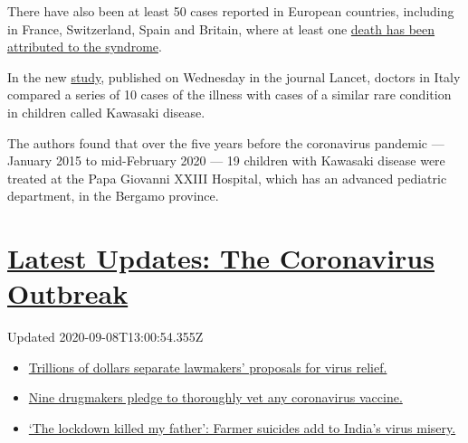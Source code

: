 There have also been at least 50 cases reported in European countries,
including in France, Switzerland, Spain and Britain, where at least one
\href{https://www.thelancet.com/journals/lancet/article/PIIS0140-6736(20)31094-1/fulltext}{death
has been attributed to the syndrome}.

In the new
\href{http://www.thelancet.com/journals/lancet/article/PIIS0140-6736(20)31103-X/fulltext}{study},
published on Wednesday in the journal Lancet, doctors in Italy compared
a series of 10 cases of the illness with cases of a similar rare
condition in children called Kawasaki disease.

The authors found that over the five years before the coronavirus
pandemic --- January 2015 to mid-February 2020 --- 19 children with
Kawasaki disease were treated at the Papa Giovanni XXIII Hospital, which
has an advanced pediatric department, in the Bergamo province.

\hypertarget{latest-updates-the-coronavirus-outbreak}{%
\section{\texorpdfstring{\href{https://www.nytimes3xbfgragh.onion/2020/09/08/world/covid-19-coronavirus.html?action=click\&pgtype=Article\&state=default\&region=MAIN_CONTENT_1\&context=storylines_live_updates}{Latest
Updates: The Coronavirus
Outbreak}}{Latest Updates: The Coronavirus Outbreak}}\label{latest-updates-the-coronavirus-outbreak}}

Updated 2020-09-08T13:00:54.355Z

\begin{itemize}
\tightlist
\item
  \href{https://www.nytimes3xbfgragh.onion/2020/09/08/world/covid-19-coronavirus.html?action=click\&pgtype=Article\&state=default\&region=MAIN_CONTENT_1\&context=storylines_live_updates\#link-46162376}{Trillions
  of dollars separate lawmakers' proposals for virus relief.}
\item
  \href{https://www.nytimes3xbfgragh.onion/2020/09/08/world/covid-19-coronavirus.html?action=click\&pgtype=Article\&state=default\&region=MAIN_CONTENT_1\&context=storylines_live_updates\#link-679303d7}{Nine
  drugmakers pledge to thoroughly vet any coronavirus vaccine.}
\item
  \href{https://www.nytimes3xbfgragh.onion/2020/09/08/world/covid-19-coronavirus.html?action=click\&pgtype=Article\&state=default\&region=MAIN_CONTENT_1\&context=storylines_live_updates\#link-1c973131}{`The
  lockdown killed my father': Farmer suicides add to India's virus
  misery.}
\end{itemize}

